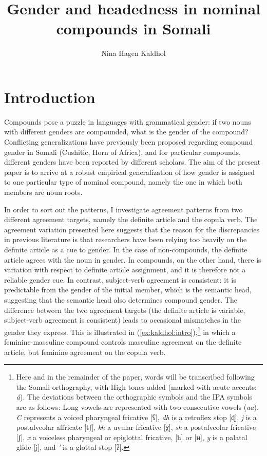 \documentclass[output=paper]{langscibook}
\author{Nina Hagen Kaldhol\affiliation{University of California, San Diego}}
\title{Gender and headedness in nominal compounds in Somali}
\begin{document}
\maketitle

\section{Introduction}\label{sec:kaldhol:intro}
Compounds pose a puzzle in languages with grammatical gender: if two nouns with different genders are compounded, what is the gender of the compound? Conflicting generalizations have previously been proposed regarding compound gender in Somali (Cushitic, Horn of Africa), and for particular compounds, different genders have been reported by different scholars. The aim of the present paper is to arrive at a robust empirical generalization of how gender is assigned to one particular type of nominal compound, namely the one in which both members are noun roots.

In order to sort out the patterns, I investigate agreement patterns from two different agreement targets, namely the definite article and the copula verb. The agreement variation presented here suggests that the reason for the discrepancies in previous literature is that researchers have been relying too heavily on the definite article as a cue to gender. In the case of non-compounds, the definite article agrees with the noun in gender. In compounds, on the other hand, there is variation with respect to definite article assignment, and it is therefore not a reliable gender cue. In contrast, subject-verb agreement is consistent: it is predictable from the gender of the initial member, which is the semantic head, suggesting that the semantic head also determines compound gender. The difference between the two agreement targets (the definite article is variable, subject-verb agreement is consistent) leads to occasional mismatches in the gender they express. This is illustrated in (\ref{ex:kaldhol:intro}),\footnote{Here and in the remainder of the paper, words will be transcribed following the Somali orthography, with High tones added (marked with acute accents: \textit{á}). The deviations between the orthographic symbols and the IPA symbols are as follows: Long vowels are represented with two consecutive vowels (\textit{aa}).  \textit{C} represents a voiced pharyngeal fricative {[ʕ]}, \textit{dh} is a retroflex stop {[ɖ]}, \textit{j} is a postalveolar affricate {[tʃ]}, \textit{kh} a uvular fricative {[χ]}, \textit{sh} a postalveolar fricative {[ʃ]}, \textit{x} a voiceless pharyngeal or epiglottal fricative, {[ħ]} or {[ʜ]}, \textit{y} is a palatal glide {[j]}, and \textit{'} is a glottal stop {[ʔ]}.} in which a feminine-masculine compound controls masculine agreement on the definite article, but feminine agreement on the copula verb.
\end{document}
